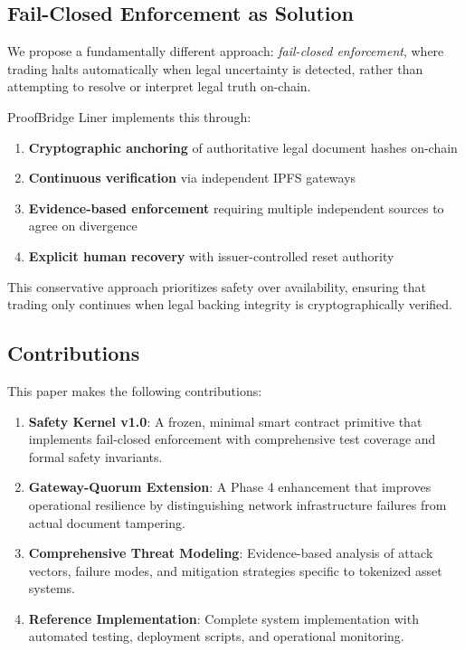 \documentclass[10pt,conference]{IEEEtran}
\begin{document}
\subsection{Fail-Closed Enforcement as Solution}
\label{subsec:fail_closed_solution}

We propose a fundamentally different approach: \textit{fail-closed enforcement}, where trading halts automatically when legal uncertainty is detected, rather than attempting to resolve or interpret legal truth on-chain.

ProofBridge Liner implements this through:
\begin{enumerate}
\item \textbf{Cryptographic anchoring} of authoritative legal document hashes on-chain
\item \textbf{Continuous verification} via independent IPFS gateways
\item \textbf{Evidence-based enforcement} requiring multiple independent sources to agree on divergence
\item \textbf{Explicit human recovery} with issuer-controlled reset authority
\end{enumerate}

This conservative approach prioritizes safety over availability, ensuring that trading only continues when legal backing integrity is cryptographically verified.

\subsection{Contributions}
\label{subsec:contributions}

This paper makes the following contributions:

\begin{enumerate}
\item \textbf{Safety Kernel v1.0}: A frozen, minimal smart contract primitive that implements fail-closed enforcement with comprehensive test coverage and formal safety invariants.

\item \textbf{Gateway-Quorum Extension}: A Phase 4 enhancement that improves operational resilience by distinguishing network infrastructure failures from actual document tampering.

\item \textbf{Comprehensive Threat Modeling}: Evidence-based analysis of attack vectors, failure modes, and mitigation strategies specific to tokenized asset systems.

\item \textbf{Reference Implementation}: Complete system implementation with automated testing, deployment scripts, and operational monitoring.
\end{enumerate}
\end{document}
